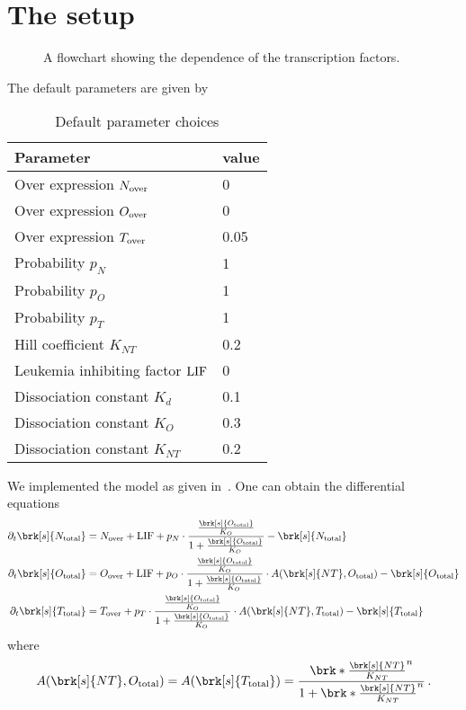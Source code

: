 \section{The setup}
\begin{figure}
  \centering
  
  \caption{A flowchart showing the dependence of the transcription factors.}
  \label{fi:flowchartTranscription}
\end{figure}
The default parameters are given by
\begin{table}[h!]
  \centering
   \begin{tabular}{l  l} 
   \hline
   Parameter & value \\ [0.5ex] 
   \hline\hline
   Over expression $N_\text{over}$ & 0 \\
   Over expression $O_\text{over}$ & 0 \\
   Over expression $T_\text{over}$ & 0.05 \\
   Probability $p_N$ & 1 \\
   Probability $p_O$ & 1 \\
   Probability $p_T$ & 1 \\
   Hill coefficient $K_{NT}$ & 0.2 \\
   Leukemia inhibiting factor $\text{LIF}$ & 0 \\
   Dissociation constant $K_d$ & 0.1 \\
   Dissociation constant $K_O$ & 0.3 \\
   Dissociation constant $K_{NT}$ & 0.2 \\
   \end{tabular}
   \caption{Default parameter choices}
   \label{tb:params}
\end{table}
We implemented the model as given in~\cite{Olariu2016}. One can obtain the differential equations
\begin{align*}
  \partial_t\brk[s]{\Ntotal} &= \Nover+\LIF+p_N\cdot\frac{\frac{\brk[s]{\Ototal}}{K_O}}{1+\frac{\brk[s]{\Ototal}}{K_O}}-\brk[s]{\Ntotal} \\
  \partial_t\brk[s]{\Ototal} &= \Oover+\LIF+p_O\cdot\frac{\frac{\brk[s]{\Ototal}}{K_O}}{1+\frac{\brk[s]{\Ototal}}{K_O}}\cdot A(\brk[s]{NT},\Ototal)-\brk[s]{\Ototal} \\
  \partial_t\brk[s]{\Ttotal} &= \Tover+p_T\cdot\frac{\frac{\brk[s]{\Ototal}}{K_O}}{1+\frac{\brk[s]{\Ototal}}{K_O}}\cdot A(\brk[s]{NT},\Ttotal)-\brk[s]{\Ttotal}
\end{align*}
where
\begin{align*}
  A(\brk[s]{NT},\Ototal) = A(\brk[s]{\Ttotal}) = \frac{\brk*{\frac{\brk[s]{NT}}{K_{NT}}^n}}{1+\brk*{\frac{\brk[s]{NT}}{K_{NT}}^n}}\,.
\end{align*}


